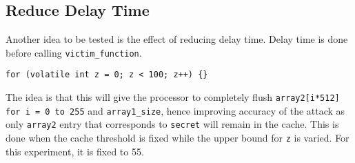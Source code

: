 \documentclass[10pt,twocolumn,letterpaper]{article}
\begin{document}
\subsection{Reduce Delay Time}
Another idea to be tested is the effect of reducing delay time. Delay time is done before calling \texttt{victim\_function}.
\begin{lstlisting}
for (volatile int z = 0; z < 100; z++) {}
\end{lstlisting}
The idea is that this will give the processor to completely flush \texttt{array2[i*512]} \lstinline{for i = 0 to 255} and \texttt{array1\_size}, hence improving accuracy of the attack as only \texttt{array2} entry that corresponds to \texttt{secret} will remain in the cache. This is done when the cache threshold is fixed while the upper bound for \texttt{z} is varied. For this experiment, it is fixed to 55.
\end{document}
